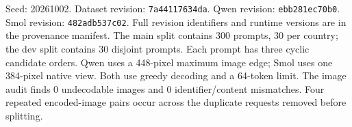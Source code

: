 Seed: 20261002. Dataset revision: \texttt{7a44117634da}. Qwen revision: \texttt{ebb281ec70b0}. Smol revision: \texttt{482adb537c02}. Full revision identifiers and runtime versions are in the provenance manifest. The main split contains 300 prompts, 30 per country; the dev split contains 30 disjoint prompts. Each prompt has three cyclic candidate orders. Qwen uses a 448-pixel maximum image edge; Smol uses one 384-pixel native view. Both use greedy decoding and a 64-token limit. The image audit finds 0 undecodable images and 0 identifier/content mismatches. Four repeated encoded-image pairs occur across the duplicate requests removed before splitting.
